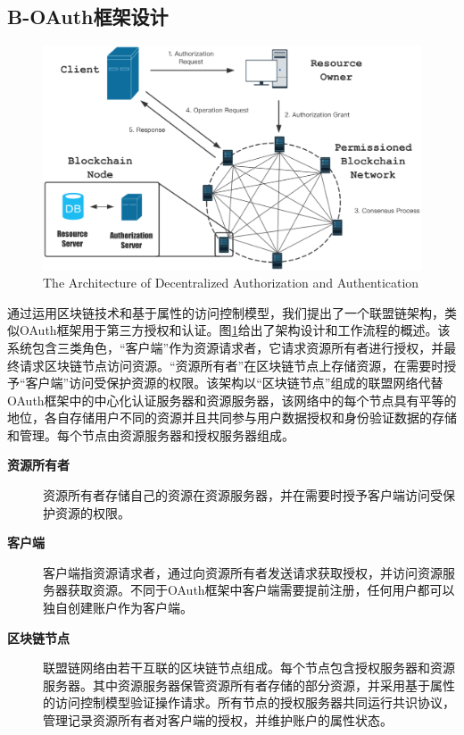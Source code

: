 \subsection{B-OAuth框架设计}

\begin{figure}
\centering
\includegraphics[width=12cm]{figures/archi.eps}
\caption{The Architecture of Decentralized Authorization and Authentication}
\label{fig:framework}
\end{figure}

通过运用区块链技术和基于属性的访问控制模型，我们提出了一个联盟链架构，类似OAuth框架用于第三方授权和认证。图\ref{fig:framework}给出了架构设计和工作流程的概述。该系统包含三类角色，“客户端”作为资源请求者，它请求资源所有者进行授权，并最终请求区块链节点访问资源。“资源所有者”在区块链节点上存储资源，在需要时授予“客户端”访问受保护资源的权限。该架构以“区块链节点”组成的联盟网络代替OAuth框架中的中心化认证服务器和资源服务器，该网络中的每个节点具有平等的地位，各自存储用户不同的资源并且共同参与用户数据授权和身份验证数据的存储和管理。每个节点由资源服务器和授权服务器组成。

\begin{description}
  \item[\textbf{资源所有者}] 资源所有者存储自己的资源在资源服务器，并在需要时授予客户端访问受保护资源的权限。
  \item[\textbf{客户端}] 客户端指资源请求者，通过向资源所有者发送请求获取授权，并访问资源服务器获取资源。不同于OAuth框架中客户端需要提前注册，任何用户都可以独自创建账户作为客户端。
  \item[\textbf{区块链节点}] 联盟链网络由若干互联的区块链节点组成。每个节点包含授权服务器和资源服务器。其中资源服务器保管资源所有者存储的部分资源，并采用基于属性的访问控制模型验证操作请求。所有节点的授权服务器共同运行共识协议，管理记录资源所有者对客户端的授权，并维护账户的属性状态。
\end{description}

